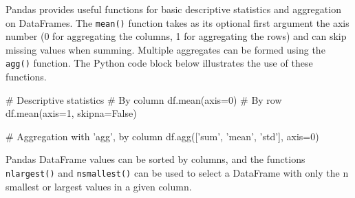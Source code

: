 



Pandas provides useful functions for basic descriptive statistics and aggregation on DataFrames. The \texttt{mean()} function takes as its optional first argument the axis number (0 for aggregating the columns, 1 for aggregating the rows) and can skip missing values when summing. Multiple aggregates can be formed using the \texttt{agg()} function. The Python code block below illustrates the use of these functions.

\begin{samepage}
\begin{pythoncode}
# Descriptive statistics
# By column
df.mean(axis=0)
# By row
df.mean(axis=1, skipna=False)

# Aggregation with 'agg', by column
df.agg(['sum', 'mean', 'std'], axis=0)
\end{pythoncode}
\end{samepage}

Pandas DataFrame values can be sorted by columns, and the functions \texttt{nlargest()} and \texttt{nsmallest()} can be used to select a DataFrame with only the n smallest or largest values in a given column.


